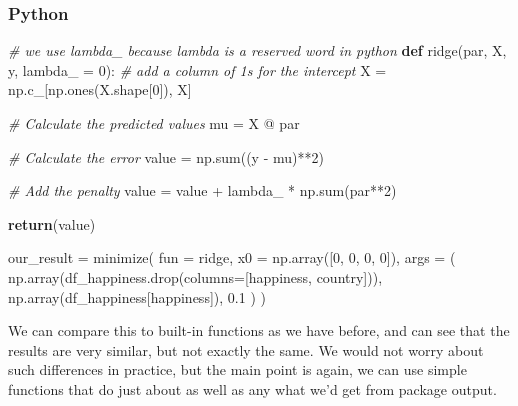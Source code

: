 \documentclass[
  letterpaper,
]{krantz}
\newenvironment{Shaded}{}{}
\newcommand{\BuiltInTok}[1]{\textcolor[rgb]{0.00,0.50,0.00}{#1}}
\newcommand{\CommentTok}[1]{\textcolor[rgb]{0.38,0.63,0.69}{\textit{#1}}}
\newcommand{\ControlFlowTok}[1]{\textcolor[rgb]{0.00,0.44,0.13}{\textbf{#1}}}
\newcommand{\DecValTok}[1]{\textcolor[rgb]{0.25,0.63,0.44}{#1}}
\newcommand{\FloatTok}[1]{\textcolor[rgb]{0.25,0.63,0.44}{#1}}
\newcommand{\KeywordTok}[1]{\textcolor[rgb]{0.00,0.44,0.13}{\textbf{#1}}}
\newcommand{\NormalTok}[1]{#1}
\newcommand{\OperatorTok}[1]{\textcolor[rgb]{0.40,0.40,0.40}{#1}}
\newcommand{\StringTok}[1]{\textcolor[rgb]{0.25,0.44,0.63}{#1}}
\begin{document}
\subsubsection{Python}

\begin{Shaded}
\begin{Highlighting}[]
\CommentTok{\# we use lambda\_ because lambda is a reserved word in python}
\KeywordTok{def}\NormalTok{ ridge(par, X, y, lambda\_ }\OperatorTok{=} \DecValTok{0}\NormalTok{):}
    \CommentTok{\# add a column of 1s for the intercept}
\NormalTok{    X }\OperatorTok{=}\NormalTok{ np.c\_[np.ones(X.shape[}\DecValTok{0}\NormalTok{]), X]}

    \CommentTok{\# Calculate the predicted values}
\NormalTok{    mu }\OperatorTok{=}\NormalTok{ X }\OperatorTok{@}\NormalTok{ par}
    
    \CommentTok{\# Calculate the error}
\NormalTok{    value }\OperatorTok{=}\NormalTok{ np.}\BuiltInTok{sum}\NormalTok{((y }\OperatorTok{{-}}\NormalTok{ mu)}\OperatorTok{**}\DecValTok{2}\NormalTok{)}
    
    \CommentTok{\# Add the penalty}
\NormalTok{    value }\OperatorTok{=}\NormalTok{ value }\OperatorTok{+}\NormalTok{ lambda\_ }\OperatorTok{*}\NormalTok{ np.}\BuiltInTok{sum}\NormalTok{(par}\OperatorTok{**}\DecValTok{2}\NormalTok{)}
    
    \ControlFlowTok{return}\NormalTok{(value)}

\NormalTok{our\_result }\OperatorTok{=}\NormalTok{ minimize(}
\NormalTok{    fun  }\OperatorTok{=}\NormalTok{ ridge,}
\NormalTok{    x0   }\OperatorTok{=}\NormalTok{ np.array([}\DecValTok{0}\NormalTok{, }\DecValTok{0}\NormalTok{, }\DecValTok{0}\NormalTok{, }\DecValTok{0}\NormalTok{]),}
\NormalTok{    args }\OperatorTok{=}\NormalTok{ (}
\NormalTok{        np.array(df\_happiness.drop(columns}\OperatorTok{=}\NormalTok{[}\StringTok{\textquotesingle{}happiness\textquotesingle{}}\NormalTok{, }\StringTok{\textquotesingle{}country\textquotesingle{}}\NormalTok{])),}
\NormalTok{        np.array(df\_happiness[}\StringTok{\textquotesingle{}happiness\textquotesingle{}}\NormalTok{]), }
        \FloatTok{0.1}
\NormalTok{    )}
\NormalTok{)}
\end{Highlighting}
\end{Shaded}

We can compare this to built-in functions as we have before, and can see
that the results are very similar, but not exactly the same. We would
not worry about such differences in practice, but the main point is
again, we can use simple functions that do just about as well as any
what we'd get from package output.
\end{document}
